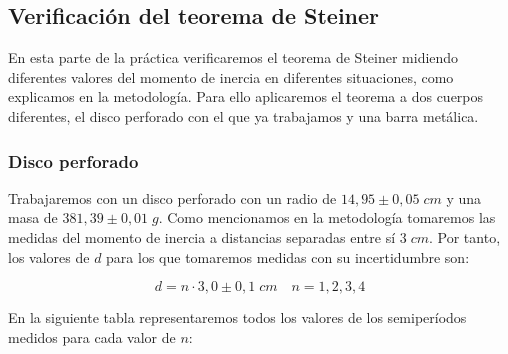 \documentclass[a4paper,12pt,titlepage]{article}
\begin{document}
\subsection{Verificación del teorema de Steiner}

En esta parte de la práctica verificaremos el teorema de Steiner midiendo diferentes valores del momento de inercia en diferentes situaciones, como explicamos en la metodología. Para ello aplicaremos el teorema a dos cuerpos diferentes, el disco perforado con el que ya trabajamos y una barra metálica.

\subsubsection{Disco perforado}

Trabajaremos con un disco perforado con un radio de $14,95 \pm 0,05 \; cm$ y una masa de $381,39 \pm 0,01 \;g$. Como mencionamos en la metodología tomaremos las medidas del momento de inercia a distancias separadas entre sí $3\;cm$. Por tanto, los valores de $d$ para los que tomaremos medidas con su incertidumbre son:

\begin{equation}
    d = n\cdot 3,0 \pm 0,1 \; cm \quad n=1,2,3,4
\end{equation}

En la siguiente tabla representaremos todos los valores de los semiperíodos medidos para cada valor de $n$:
\end{document}
